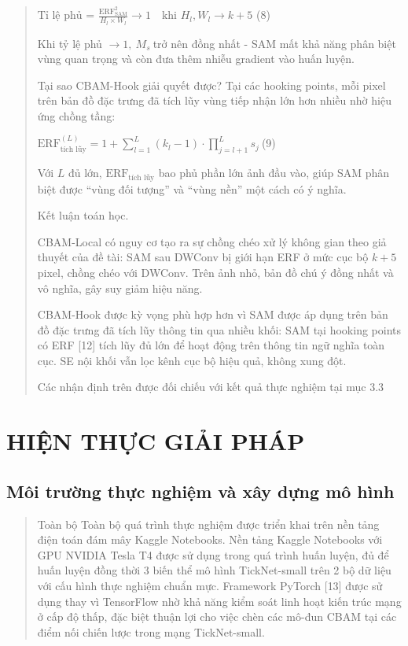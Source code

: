 \documentclass[
  12pt,
  a4paper,
]{report}
\begin{document}
\begin{quote}
\(\text{Tỉ~lệ~phủ}\) =
\(\frac{\text{ERF}_{\text{SAM}}^{2}}{H_{l} \times W_{l}} \rightarrow 1\quad\text{khi~}H_{l},W_{l} \rightarrow k + 5\)
(8)

Khi tỷ lệ phủ \(\rightarrow 1,\ M_{s}\ \)trở nên đồng nhất - SAM mất khả
năng phân biệt vùng quan trọng và còn đưa thêm nhiễu gradient vào huấn
luyện.

Tại sao CBAM-Hook giải quyết được? Tại các hooking points, mỗi pixel
trên bản đồ đặc trưng đã tích lũy vùng tiếp nhận lớn hơn nhiều nhờ hiệu
ứng chồng tầng:

\(\text{ERF}_{\text{tích~lũy}}^{(L)} = 1 + \sum_{l = 1}^{L}\left( k_{l} - 1 \right) \cdot \prod_{j = l + 1}^{L}s_{j}\ \)(9)

Với \(L\) đủ lớn, \(\text{ERF}_{\text{tích~lũy}}\) bao phủ phần lớn ảnh
đầu vào, giúp SAM phân biệt được ``vùng đối tượng'' và ``vùng nền'' một
cách có ý nghĩa.

Kết luận toán học.

CBAM-Local có nguy cơ tạo ra sự chồng chéo xử lý không gian theo giả
thuyết của đề tài: SAM sau DWConv bị giới hạn ERF ở mức cục bộ
\(k + 5\ \)pixel, chồng chéo với DWConv. Trên ảnh nhỏ, bản đồ chú ý đồng
nhất và vô nghĩa, gây suy giảm hiệu năng.

CBAM-Hook được kỳ vọng phù hợp hơn vì SAM được áp dụng trên bản đồ đặc
trưng đã tích lũy thông tin qua nhiều khối: SAM tại hooking points có
ERF {[}12{]} tích lũy đủ lớn để hoạt động trên thông tin ngữ nghĩa toàn
cục. SE nội khối vẫn lọc kênh cục bộ hiệu quả, không xung đột.

Các nhận định trên được đối chiếu với kết quả thực nghiệm tại mục 3.3
\end{quote}

\section{HIỆN THỰC GIẢI
PHÁP}\label{hiux1ec7n-thux1ef1c-giux1ea3i-phuxe1p}

\subsection{Môi trường thực nghiệm và xây dựng mô
hình}\label{muxf4i-trux1b0ux1eddng-thux1ef1c-nghiux1ec7m-vuxe0-xuxe2y-dux1ef1ng-muxf4-huxecnh}

\begin{quote}
Toàn bộ Toàn bộ quá trình thực nghiệm được triển khai trên nền tảng điện
toán đám mây Kaggle Notebooks. Nền tảng Kaggle Notebooks với GPU NVIDIA
Tesla T4 được sử dụng trong quá trình huấn luyện, đủ để huấn luyện đồng
thời 3 biến thể mô hình TickNet-small trên 2 bộ dữ liệu với cấu hình
thực nghiệm chuẩn mực. Framework PyTorch {[}13{]} được sử dụng thay vì
TensorFlow nhờ khả năng kiểm soát linh hoạt kiến trúc mạng ở cấp độ
thấp, đặc biệt thuận lợi cho việc chèn các mô-đun CBAM tại các điểm nối
chiến lược trong mạng TickNet-small.
\end{quote}
\end{document}
